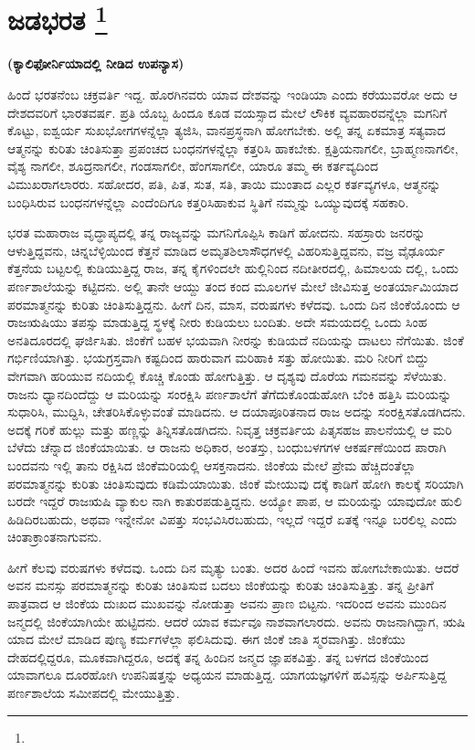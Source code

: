 
\chapter[ಜಡಭರತ]{ಜಡಭರತ \protect\footnote{}}

\centerline{\textbf{(ಕ್ಯಾಲಿಫೋರ್ನಿಯಾದಲ್ಲಿ ನೀಡಿದ ಉಪನ್ಯಾಸ)}}

ಹಿಂದೆ ಭರತನೆಂಬ ಚಕ್ರವರ್ತಿ ಇದ್ದ. ಹೊರಗಿನವರು ಯಾವ ದೇಶವನ್ನು ಇಂಡಿಯಾ ಎಂದು ಕರೆಯುವರೋ ಅದು ಆ ದೇಶದವರಿಗೆ ಭಾರತವರ್ಷ. ಪ್ರತಿ ಯೊಬ್ಬ ಹಿಂದೂ ಕೂಡ ವಯಸ್ಸಾದ ಮೇಲೆ ಲೌಕಿಕ ವ್ಯವಹಾರವನ್ನೆಲ್ಲಾ ಮಗನಿಗೆ ಕೊಟ್ಟು, ಐಶ್ವರ್ಯ ಸುಖಭೋಗಗಳನ್ನೆಲ್ಲಾ ತ್ಯಜಿಸಿ, ವಾನಪ್ರಸ್ಥನಾಗಿ ಹೋಗಬೇಕು. ಅಲ್ಲಿ ತನ್ನ ಏಕಮಾತ್ರ ಸತ್ಯವಾದ ಆತ್ಮನನ್ನು ಕುರಿತು ಚಿಂತಿಸುತ್ತಾ ಪ್ರಪಂಚದ ಬಂಧನಗಳನ್ನೆಲ್ಲಾ ಕತ್ತರಿಸಿ ಹಾಕಬೇಕು. ಕ್ಷತ್ರಿಯನಾಗಲೀ, ಬ್ರಾಹ್ಮಣನಾಗಲೀ, ವೈಶ್ಯ ನಾಗಲೀ, ಶೂದ್ರನಾಗಲೀ, ಗಂಡಸಾಗಲೀ, ಹೆಂಗಸಾಗಲೀ, ಯಾರೂ ತಮ್ಮ ಈ ಕರ್ತವ್ಯದಿಂದ ವಿಮುಖರಾಗಲಾರರು. ಸಹೋದರ, ಪತಿ, ಪಿತ, ಸುತ, ಸತಿ, ತಾಯಿ ಮುಂತಾದ ಎಲ್ಲರ ಕರ್ತವ್ಯಗಳೂ, ಆತ್ಮನನ್ನು ಬಂಧಿಸಿರುವ ಬಂಧನಗಳನ್ನೆಲ್ಲಾ ಎಂದೆಂದಿಗೂ ಕತ್ತರಿಸಿಹಾಕುವ ಸ್ಥಿತಿಗೆ ನಮ್ಮನ್ನು ಒಯ್ಯುವುದಕ್ಕೆ ಸಹಕಾರಿ.

ಭರತ ಮಹಾರಾಜ ವೃದ್ಧಾಪ್ಯದಲ್ಲಿ ತನ್ನ ರಾಜ್ಯವನ್ನು ಮಗನಿಗೊಪ್ಪಿಸಿ ಕಾಡಿಗೆ ಹೋದನು. ಸಹಸ್ರಾರು ಜನರನ್ನು ಆಳುತ್ತಿದ್ದವನು, ಚಿನ್ನಬೆಳ್ಳಿಯಿಂದ ಕೆತ್ತನೆ ಮಾಡಿದ ಅಮೃತಶಿಲಾಸೌಧಗಳಲ್ಲಿ ವಿಹರಿಸುತ್ತಿದ್ದವನು, ವಜ್ರ ವೈಢೂರ್ಯ ಕೆತ್ತನೆಯ ಬಟ್ಟಲಲ್ಲಿ ಕುಡಿಯುತ್ತಿದ್ದ ರಾಜ, ತನ್ನ ಕೈಗಳಿಂದಲೇ ಹುಲ್ಲಿನಿಂದ ನದೀತೀರದಲ್ಲಿ, ಹಿಮಾಲಯ ದಲ್ಲಿ, ಒಂದು ಪರ್ಣಶಾಲೆಯನ್ನು ಕಟ್ಟಿದನು. ಅಲ್ಲಿ ತಾನೇ ಆಯ್ದು ತಂದ ಕಂದ ಮೂಲಗಳ ಮೇಲೆ ಜೀವಿಸುತ್ತ ಅಂತರ್ಯಾಮಿಯಾದ ಪರಮಾತ್ಮನನ್ನು ಕುರಿತು ಚಿಂತಿಸುತ್ತಿದ್ದನು. ಹೀಗೆ ದಿನ, ಮಾಸ, ವರುಷಗಳು ಕಳೆದವು. ಒಂದು ದಿನ ಜಿಂಕೆಯೊಂದು ಆ ರಾಜಋಷಿಯು ತಪಸ್ಸು ಮಾಡುತ್ತಿದ್ದ ಸ್ಥಳಕ್ಕೆ ನೀರು ಕುಡಿಯಲು ಬಂದಿತು. ಅದೇ ಸಮಯದಲ್ಲಿ ಒಂದು ಸಿಂಹ ಅನತಿದೂರದಲ್ಲಿ ಘರ್ಜಿಸಿತು. ಜಿಂಕೆಗೆ ಬಹಳ ಭಯವಾಗಿ ನೀರನ್ನು ಕುಡಿಯದೆ ನದಿಯನ್ನು ದಾಟಲು ನೆಗೆಯಿತು. ಜಿಂಕೆ ಗರ್ಭಿಣಿಯಾಗಿತ್ತು. ಭಯಗ್ರಸ್ತವಾಗಿ ಕಷ್ಟದಿಂದ ಹಾರುವಾಗ ಮರಿಹಾಕಿ ಸತ್ತು ಹೋಯಿತು. ಮರಿ ನೀರಿಗೆ ಬಿದ್ದು ವೇಗವಾಗಿ ಹರಿಯುವ ನದಿಯಲ್ಲಿ ಕೊಚ್ಚಿ ಕೊಂಡು ಹೋಗುತ್ತಿತ್ತು. ಆ ದೃಶ್ಯವು ದೊರೆಯ ಗಮನವನ್ನು ಸೆಳೆಯಿತು. ರಾಜನು ಧ್ಯಾನದಿಂದೆದ್ದು ಆ ಮರಿಯನ್ನು ಸಂರಕ್ಷಿಸಿ ಪರ್ಣಶಾಲೆಗೆ ತೆಗೆದುಕೊಂಡುಹೋಗಿ ಬೆಂಕಿ ಹತ್ತಿಸಿ ಮರಿಯನ್ನು ಸುಧಾರಿಸಿ, ಮುದ್ದಿಸಿ, ಚೇತರಿಸಿಕೊಳ್ಳುವಂತೆ ಮಾಡಿದನು. ಆ ದಯಾಪೂರಿತನಾದ ರಾಜ ಅದನ್ನು ಸಂರಕ್ಷಿಸತೊಡಗಿದನು. ಅದಕ್ಕೆ ಗರಿಕೆ ಹುಲ್ಲು ಮತ್ತು ಹಣ್ಣನ್ನು ತಿನ್ನಿಸತೊಡಗಿದನು. ನಿವೃತ್ತ ಚಕ್ರವರ್ತಿಯ ಪಿತೃಸಹಜ ಪಾಲನೆಯಲ್ಲಿ ಆ ಮರಿ ಬೆಳೆದು ಚೆನ್ನಾದ ಜಿಂಕೆಯಾಯಿತು. ಆ ರಾಜನು ಅಧಿಕಾರ, ಅಂತಸ್ತು, ಬಂಧುಬಳಗಗಳ ಆಕರ್ಷಣೆಯಿಂದ ಪಾರಾಗಿ ಬಂದವನು ಇಲ್ಲಿ ತಾನು ರಕ್ಷಿಸಿದ ಜಿಂಕೆಮರಿಯಲ್ಲಿ ಆಸಕ್ತನಾದನು. ಜಿಂಕೆಯ ಮೇಲೆ ಪ್ರೇಮ ಹೆಚ್ಚಿದಂತೆಲ್ಲಾ ಪರಮಾತ್ಮನನ್ನು ಕುರಿತು ಚಿಂತಿಸುವುದು ಕಡಿಮೆಯಾಯಿತು. ಜಿಂಕೆ ಮೇಯುವು ದಕ್ಕೆ ಕಾಡಿಗೆ ಹೋಗಿ ಕಾಲಕ್ಕೆ ಸರಿಯಾಗಿ ಬರದೇ ಇದ್ದರೆ ರಾಜಋಷಿ ವ್ಯಾಕುಲ ನಾಗಿ ಕಾತುರಪಡುತ್ತಿದ್ದನು. ಅಯ್ಯೋ ಪಾಪ, ಆ ಮರಿಯನ್ನು ಯಾವುದೋ ಹುಲಿ ಹಿಡಿದಿರಬಹುದು, ಅಥವಾ ಇನ್ನೇನೋ ವಿಪತ್ತು ಸಂಭವಿಸಿರಬಹುದು, ಇಲ್ಲದೆ ಇದ್ದರೆ ಏತಕ್ಕೆ ಇನ್ನೂ ಬರಲಿಲ್ಲ ಎಂದು ಚಿಂತಾಕ್ರಾಂತನಾಗುವನು.

ಹೀಗೆ ಕೆಲವು ವರುಷಗಳು ಕಳೆದವು. ಒಂದು ದಿನ ಮೃತ್ಯು ಬಂತು. ಅದರ ಹಿಂದೆ ಇವನು ಹೋಗಬೇಕಾಯಿತು. ಆದರೆ ಅವನ ಮನಸ್ಸು ಪರಮಾತ್ಮನನ್ನು ಕುರಿತು ಚಿಂತಿಸುವ ಬದಲು ಜಿಂಕೆಯನ್ನು ಕುರಿತು ಚಿಂತಿಸುತ್ತಿತ್ತು. ತನ್ನ ಪ್ರೀತಿಗೆ ಪಾತ್ರವಾದ ಆ ಜಿಂಕೆಯ ದುಃಖದ ಮುಖವನ್ನು ನೋಡುತ್ತಾ ಅವನು ಪ್ರಾಣ ಬಿಟ್ಟನು. ಇದರಿಂದ ಅವನು ಮುಂದಿನ ಜನ್ಮದಲ್ಲಿ ಜಿಂಕೆಯಾಗಿಯೇ ಹುಟ್ಟಿದನು. ಆದರೆ ಯಾವ ಕರ್ಮವೂ ನಾಶವಾಗಲಾರದು. ಅವನು ರಾಜನಾಗಿದ್ದಾಗ, ಋಷಿ ಯಾದ ಮೇಲೆ ಮಾಡಿದ ಪುಣ್ಯ ಕರ್ಮಗಳೆಲ್ಲಾ ಫಲಿಸಿದುವು. ಈಗ ಜಿಂಕೆ ಜಾತಿ ಸ್ಮರವಾಗಿತ್ತು. ಜಿಂಕೆಯು ದೇಹದಲ್ಲಿದ್ದರೂ, ಮೂಕವಾಗಿದ್ದರೂ, ಅದಕ್ಕೆ ತನ್ನ ಹಿಂದಿನ ಜನ್ಮದ ಜ್ಞಾಪಕವಿತ್ತು. ತನ್ನ ಬಳಗದ ಜಿಂಕೆಯಿಂದ ಯಾವಾಗಲೂ ದೂರಹೋಗಿ ಉಪನಿಷತ್ತನ್ನು ಅಧ್ಯಯನ ಮಾಡುತ್ತಿದ್ದ. ಯಾಗಯಜ್ಞಗಳಿಗೆ ಹವಿಸ್ಸನ್ನು ಅರ್ಪಿಸುತ್ತಿದ್ದ ಪರ್ಣಶಾಲೆಯ ಸಮೀಪದಲ್ಲಿ ಮೇಯುತ್ತಿತ್ತು.

